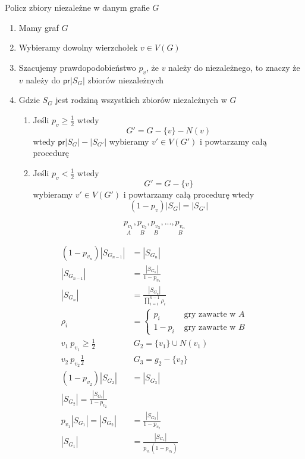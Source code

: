 \begin{problem*}
Policz zbiory niezależne w danym grafie $G$
\begin{enumerate}
\item Mamy graf $G$
\item Wybieramy dowolny wierzchołek $v\in V(G)$
\item Szacujemy prawdopodobieństwo $p_v$, że $v$ należy do niezależnego, to znaczy że $v$ należy do $\mathsf{pr}|S_G|$ zbiorów niezależnych \
\item Gdzie $S_G$ jest rodziną wszystkich zbiorów niezależnych w $G$
\begin{enumerate}[label=\Alph*)]
\item Jeśli $p_v\geq \frac{1}{2}$ wtedy $$G'=G- \{v\}-N(v)$$ wtedy $\mathsf{pr}|S_G|-|S_{G'}|$ wybieramy $v'\in V(G')$ i powtarzamy całą procedurę
\item Jeśli $p_v < \frac{1}{2}$ wtedy $$G'=G- \{v\}$$ wybieramy $v'\in V(G')$ i powtarzamy całą procedurę wtedy $$(1-p_v)|S_G|=|S_{G'}|$$
\end{enumerate}
\end{enumerate}
$$\underset{A}{p_{v_1}},\underset{B}{p_{v_2}},\underset{B}{p_{v_3}},...,\underset{B}{p_{v_n}}$$
\begin{figure}[H]
\centering
{}
\end{figure}
\begin{align*}
(1-p_{v_n})|S_{G_{n-1}}|&=|S_{G_n}|\\
|S_{G_{n-1}}|&=\frac{|S_{G_n}|}{1-p_{v_n}}\\
|S_{G_n}|&=\frac{|S_{G_n}|}{\prod_{i=i}^{n-1}\rho _i}\\
\rho _i &= \left\{\begin{matrix}
p_i & \text{ gry zawarte w } A\\
1-p_i &  \text{ gry zawarte w } B
\end{matrix}\right.\\
v_1\ p_{v_1}\geq \frac{1}{2}\ &\ G_2=\{v_1\}\cup N(v_1)\\
v_2\ p_{v_2}\frac{1}{2}\ &\ G_3=g_2- \{v_2\}\\
(1-p_{v_2})|S_{G_2}|&=|S_{G_3}|\\
|S_{G_2}|=\frac{|S_{G_3}|}{1-p_{v_2}}\\
p_{v_1}|S_{G_1}|=|S_{G_2}|&=\frac{|S_{G_3}|}{1-p_{v_2}}\\
|S_{G_1}|&=\frac{|S_{G_3}|}{p_{v_1}(1-p_{v_2})}
\end{align*}
\end{problem*}

